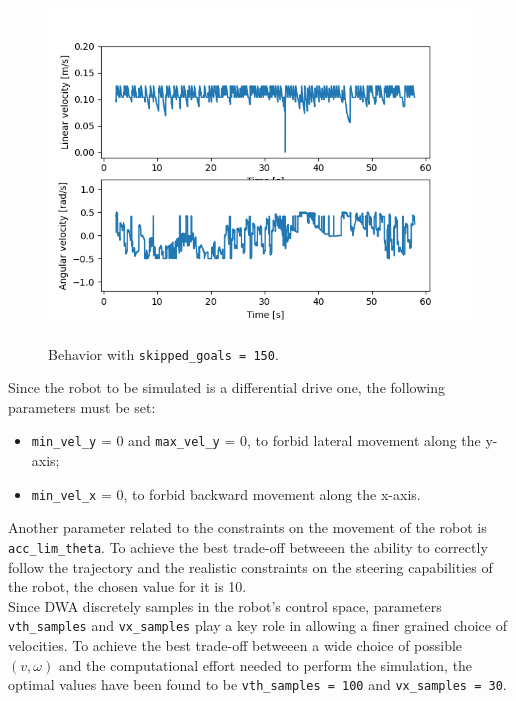 \documentclass[11pt,a4paper]{article}
\begin{document}
\begin{figure}[H]
{        \includegraphics[scale=0.5]{different_params/dwa_skippedgoals150/Linear_and_Angular_Velocities.png}
    }
    \caption[]{Behavior with \texttt{skipped\_goals = 150}.}
\end{figure}

Since the robot to be simulated is a differential drive one, the following parameters must be set:
\begin{itemize}
    \item \texttt{min\_vel\_y} = 0 and \texttt{max\_vel\_y} = 0, to forbid lateral movement along the y-axis;
    \item \texttt{min\_vel\_x} = 0, to forbid backward movement along the x-axis.\\
\end{itemize}

Another parameter related to the constraints on the movement of the robot is \texttt{acc\_lim\_theta}.
To achieve the best trade-off betweeen the ability to correctly follow the trajectory and the realistic
constraints on the steering capabilities of the robot, the chosen value for it is 10.\\

Since DWA discretely samples in the robot's control space, parameters \texttt{vth\_samples}
and \texttt{vx\_samples} play a key role in allowing a finer grained choice of velocities.
To achieve the best trade-off betweeen a wide choice of possible $(v,\omega)$ and the computational effort
needed to perform the simulation, the optimal values have been found to be \texttt{vth\_samples = 100}
and \texttt{vx\_samples = 30}.\\
\end{document}
